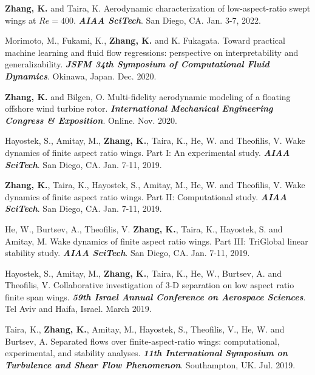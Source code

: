 \documentclass[10pt]{article}
\begin{document}
{\small
\begin{etaremune}

\item \textbf{Zhang, K.} and Taira, K. Aerodynamic characterization of low-aspect-ratio swept wings at $Re=400$. \textit{\textbf{AIAA SciTech}}. San Diego, CA. Jan. 3-7, 2022.

\item Morimoto, M., Fukami, K., \textbf{Zhang, K.} and K. Fukagata. Toward practical machine learning and fluid flow regressions: perspective on interpretability and generalizability. \textit{\textbf{JSFM 34th Symposium of Computational Fluid Dynamics}}. Okinawa, Japan. Dec. 2020.

\item \textbf{Zhang, K.} and Bilgen, O. Multi-fidelity aerodynamic modeling of a floating offshore wind turbine rotor. \textit{\textbf{International Mechanical Engineering Congress \& Exposition}}. Online. Nov. 2020.

\item Hayostek, S., Amitay, M., \textbf{Zhang, K.}, Taira, K., He, W. and Theofilis, V. Wake dynamics of finite aspect ratio wings. Part I: An experimental study. \textit{\textbf{AIAA SciTech}}. San Diego, CA. Jan. 7-11, 2019.

\item \textbf{Zhang, K.}, Taira, K., Hayostek, S., Amitay, M., He, W. and Theofilis, V. Wake dynamics of finite aspect ratio wings. Part II: Computational study. \textit{\textbf{AIAA SciTech}}. San Diego, CA. Jan. 7-11, 2019.

\item He, W., Burtsev, A., Theofilis, V. \textbf{Zhang, K.}, Taira, K., Hayostek, S. and Amitay, M. Wake dynamics of finite aspect ratio wings. Part III: TriGlobal linear stability study.
 \textit{\textbf{AIAA SciTech}}. San Diego, CA. Jan. 7-11, 2019.

\item Hayostek, S., Amitay, M., \textbf{Zhang, K.}, Taira, K., He, W., Burtsev, A. and Theofilis, V. Collaborative investigation of 3-D separation on low aspect ratio finite span wings.
 \textit{\textbf{59th Israel Annual Conference on Aerospace Sciences}}. Tel Aviv and Haifa, Israel. March 2019.

\item Taira, K., \textbf{Zhang, K.}, Amitay, M., Hayostek, S., Theofilis, V., He, W. and Burtsev, A. Separated flows over finite-aspect-ratio wings: computational, experimental, and stability analyses. \textit{\textbf{11th International Symposium on Turbulence and Shear Flow Phenomenon}}. Southampton, UK. Jul. 2019.


\end{etaremune}}
\end{document}
